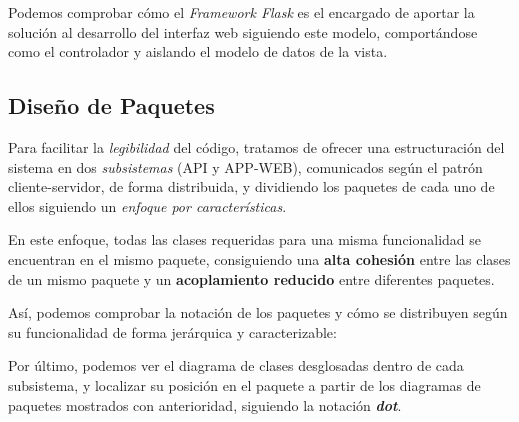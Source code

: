 
Podemos comprobar cómo el \textit{Framework Flask} es el encargado de aportar la solución al desarrollo del interfaz web siguiendo este modelo, comportándose como el controlador y aislando el modelo de datos de la vista.

\subsection{Diseño de Paquetes}

Para facilitar la \textit{legibilidad} del código, tratamos de ofrecer una estructuración del sistema en dos \textit{subsistemas} (API y APP-WEB), comunicados según el patrón cliente-servidor, de forma distribuida, y dividiendo los paquetes de cada uno de ellos siguiendo un \textit{enfoque por características}.

En este enfoque, todas las clases requeridas para una misma funcionalidad se encuentran en el mismo paquete, consiguiendo una \textbf{alta cohesión} entre las clases de un mismo paquete y un \textbf{acoplamiento reducido} entre diferentes paquetes.

Así, podemos comprobar la notación de los paquetes y cómo se distribuyen según su funcionalidad de forma jerárquica y caracterizable:







Por último, podemos ver el diagrama de clases desglosadas dentro de cada subsistema, y localizar su posición en el paquete a partir de los diagramas de paquetes mostrados con anterioridad, siguiendo la notación \textit{\textbf{dot}}.






